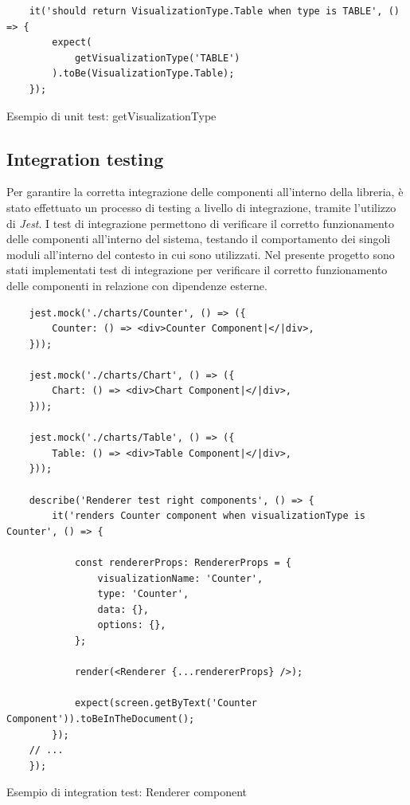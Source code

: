 \begin{listing}[H]
    \begin{verbatim}
    it('should return VisualizationType.Table when type is TABLE', () => {
        expect(
            getVisualizationType('TABLE')
        ).toBe(VisualizationType.Table);
    });
    \end{verbatim}
    \caption{Esempio di unit test: getVisualizationType}
    \label{listing:test_getVisualizationType}
\end{listing}

\subsection{Integration testing}
Per garantire la corretta integrazione delle componenti all'interno della libreria, è stato effettuato un processo di testing a livello di integrazione,
tramite l'utilizzo di \textit{Jest}. \newline
I test di integrazione permettono di verificare il corretto funzionamento delle componenti all'interno del sistema, testando il comportamento
dei singoli moduli all'interno del contesto in cui sono utilizzati. \newline
Nel presente progetto sono stati implementati test di integrazione per verificare il corretto funzionamento delle componenti in relazione con dipendenze
esterne.

\begin{listing}[H]
    \begin{verbatim}
    jest.mock('./charts/Counter', () => ({
        Counter: () => <div>Counter Component|</|div>,
    }));

    jest.mock('./charts/Chart', () => ({
        Chart: () => <div>Chart Component|</|div>,
    }));

    jest.mock('./charts/Table', () => ({
        Table: () => <div>Table Component|</|div>,
    }));
    
    describe('Renderer test right components', () => {
        it('renders Counter component when visualizationType is Counter', () => {

            const rendererProps: RendererProps = {
                visualizationName: 'Counter',
                type: 'Counter',
                data: {},
                options: {},
            };

            render(<Renderer {...rendererProps} />);

            expect(screen.getByText('Counter Component')).toBeInTheDocument();
        });
    // ...
    });
    \end{verbatim}
    \caption{Esempio di integration test: Renderer component}
    \label{listing:test_Renderer_integration}
\end{listing}

